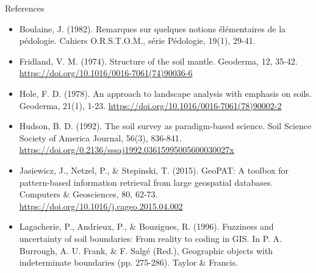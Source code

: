 \documentclass[aspectratio=169, 10pt]{beamer}
\begin{document}
\begin{frame}[allowframebreaks]{References}

  \begin{scriptsize}
\begin{itemize}


    \item Boulaine, J. (1982). Remarques sur quelques notions élémentaires de la pédologie. Cahiers O.R.S.T.O.M., série Pédologie, 19(1), 29-41.

 
    \item Fridland, V. M. (1974). Structure of the soil mantle. Geoderma, 12, 35-42. \url{https://doi.org/10.1016/0016-7061(74)90036-6}

    \item Hole, F. D. (1978). An approach to landscape analysis with emphasis on soils. Geoderma, 21(1), 1-23. \url{https://doi.org/10.1016/0016-7061(78)90002-2}

    \item Hudson, B. D. (1992). The soil survey as paradigm-based science. Soil Science Society of America Journal, 56(3), 836-841. \url{https://doi.org/0.2136/sssaj1992.03615995005600030027x}

    \item Jasiewicz, J., Netzel, P., \& Stepinski, T. (2015). GeoPAT: A toolbox for pattern-based information retrieval from large geospatial databases. Computers \& Geosciences, 80, 62-73. \url{https://doi.org/10.1016/j.cageo.2015.04.002}

    \item Lagacherie, P., Andrieux, P., \& Bouzigues, R. (1996). Fuzziness and uncertainty of soil boundaries: From reality to coding in GIS. In P. A. Burrough, A. U. Frank, \& F. Salgé (Red.), Geographic objects with indeterminate boundaries (pp. 275-286). Taylor \& Francis.


\end{itemize}
\end{scriptsize}
\end{frame}
\end{document}
